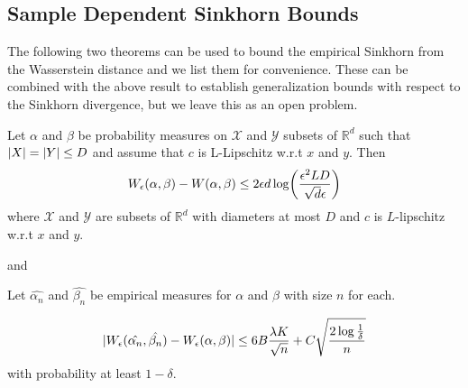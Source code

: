 \subsection{Sample Dependent Sinkhorn Bounds}

The following two theorems can be used to bound the empirical Sinkhorn from the Wasserstein distance \cite{Genevay2018} and we list them for convenience. These can be combined with the above result to establish generalization bounds with respect to the Sinkhorn divergence, but we leave this as an open problem.
 
\begin{theorem}
	\label{divergence_sinkhorn_from_wasserstein}
	Let $\alpha$ and $\beta$ be probability measures on $\mathcal{X}$ and $\mathcal{Y}$ subsets of $\mathbb{R}^d$ such that $\lvert X\rvert=\lvert Y\rvert\leq D$ and assume that $c$ is L-Lipschitz w.r.t $x$ and $y$. Then
	$$W_{\epsilon}(\alpha,\beta)-W(\alpha,\beta) \leq 2\epsilon d \log \paren*{\frac{\epsilon^2 L D}{\sqrt{d}\epsilon}}$$ where $\mathcal{X}$ and $\mathcal{Y}$ are subsets of $\mathbb{R}^d$ with diameters at most $D$ and $c$ is $L$-lipschitz w.r.t $x$ and $y$.
\end{theorem}

and

\begin{theorem}
	Let $\hat{\alpha_n}$ and $\hat{\beta_n}$ be empirical measures for $\alpha$ and $\beta$ with size $n$ for each.
	
	\[
	\lvert W_{\epsilon}(\hat{\alpha_n},\hat{\beta_n})-W_{\epsilon}(\alpha,\beta)\rvert \leq 6B \frac{\lambda K}{\sqrt{n}} + C\sqrt{\frac{2 \log\frac{1}{\delta}}{n}}
	\] with probability at least $1-\delta$.
\end{theorem}

